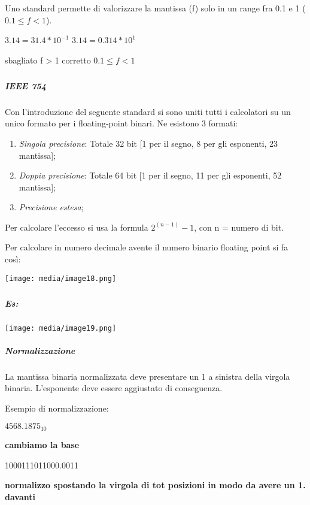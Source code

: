 Uno standard permette di valorizzare la mantissa (f) solo in un range
fra 0.1 e 1 (\(0.1 \leq f < 1\)).

\(3.14 = 31.4*10^{- 1}\) \(3.14 = 0.314*10^{1}\)

sbagliato f \textgreater{} 1 corretto \(0.1 \leq f < 1\)

\subparagraph{}\label{section}

\subparagraph{\texorpdfstring{\emph{IEEE
754}}{IEEE 754}}\label{ieee-754}

Con l'introduzione del seguente standard si sono uniti tutti i
calcolatori su un unico formato per i floating-point binari. Ne esistono
3 formati:

\begin{enumerate}
\def\labelenumi{\arabic{enumi}.}
\item
  \emph{Singola precisione}: Totale 32 bit {[}1 per il segno, 8 per gli
  esponenti, 23 mantissa{]};
\item
  \emph{Doppia precisione}: Totale 64 bit {[}1 per il segno, 11 per gli
  esponenti, 52 mantissa{]};
\item
  \emph{Precisione estesa};
\end{enumerate}

Per calcolare l'eccesso si usa la formula \(2^{(n - 1)} - 1\), con n =
numero di bit.

Per calcolare in numero decimale avente il numero binario floating point
si fa così:

\texttt{[image: media/image18.png]}

\subparagraph{}\label{section-1}

\subparagraph{}\label{section-2}

\subparagraph{Es:}\label{es}

\texttt{[image: media/image19.png]}

\subparagraph{\texorpdfstring{\emph{Normalizzazione}}{Normalizzazione}}\label{normalizzazione}

La mantissa binaria normalizzata deve presentare un 1 a sinistra della
virgola binaria. L'esponente deve essere aggiustato di conseguenza.

Esempio di normalizzazione:

\({4568.1875}_{10}\)

\textbf{cambiamo la base}

1000111011000.0011

\textbf{normalizzo spostando la virgola di tot posizioni in modo da
avere un 1. davanti}

